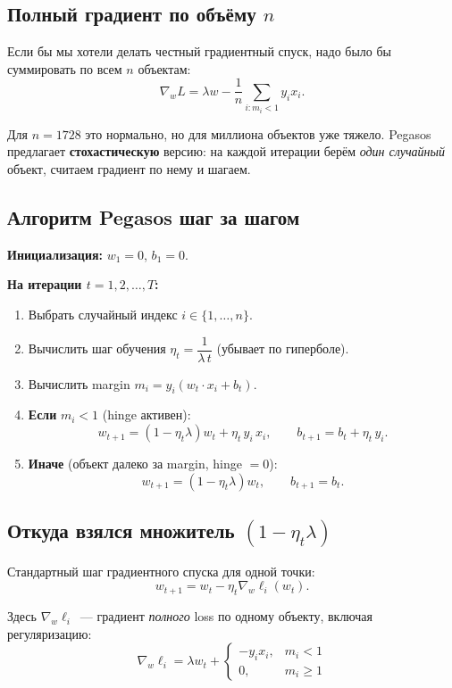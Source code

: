 \documentclass[12pt,a4paper]{article}
\begin{document}
\subsection{Полный градиент по объёму $n$}

Если бы мы хотели делать честный градиентный спуск, надо было бы суммировать по всем $n$ объектам:
\[
  \nabla_w L = \lambda w - \frac{1}{n}\sum_{i: m_i < 1} y_i x_i.
\]

Для $n = 1728$ это нормально, но для миллиона объектов уже тяжело. Pegasos предлагает \textbf{стохастическую} версию: на каждой итерации берём \emph{один случайный} объект, считаем градиент по нему и шагаем.

\subsection{Алгоритм Pegasos шаг за шагом}

\textbf{Инициализация:} $w_1 = 0$, $b_1 = 0$.

\textbf{На итерации $t = 1, 2, \ldots, T$:}
\begin{enumerate}
  \item Выбрать случайный индекс $i \in \{1, \ldots, n\}$.
  \item Вычислить шаг обучения $\eta_t = \dfrac{1}{\lambda\, t}$ (убывает по гиперболе).
  \item Вычислить margin $m_i = y_i(w_t \cdot x_i + b_t)$.
  \item \textbf{Если} $m_i < 1$ (hinge активен):
    \[
      w_{t+1} = (1 - \eta_t \lambda) w_t + \eta_t\, y_i\, x_i,
      \qquad b_{t+1} = b_t + \eta_t\, y_i.
    \]
  \item \textbf{Иначе} (объект далеко за margin, hinge $= 0$):
    \[
      w_{t+1} = (1 - \eta_t \lambda) w_t, \qquad b_{t+1} = b_t.
    \]
\end{enumerate}

\subsection{Откуда взялся множитель $(1 - \eta_t \lambda)$}

Стандартный шаг градиентного спуска для одной точки:
\[
  w_{t+1} = w_t - \eta_t \nabla_w \ell_i(w_t).
\]

Здесь $\nabla_w \ell_i$~--- градиент \emph{полного} loss по одному объекту, включая регуляризацию:
\[
  \nabla_w \ell_i = \lambda w_t + \begin{cases} -y_i x_i, & m_i < 1\\ 0, & m_i \ge 1\end{cases}
\]
\end{document}

